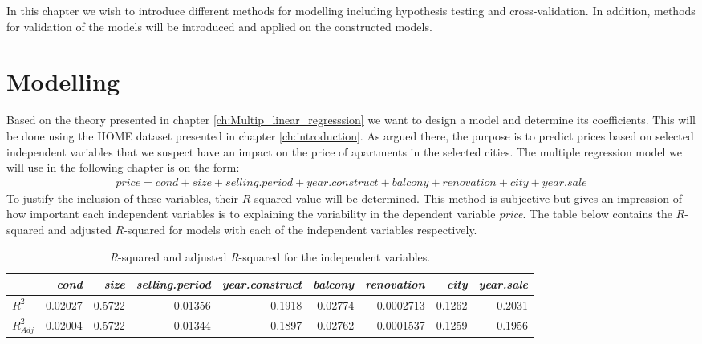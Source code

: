 In this chapter we wish to introduce different methods for modelling including hypothesis testing and cross-validation. In addition, methods for validation of the models will be introduced and applied on the constructed models.

\section{Modelling} \label{sec:modelling}
Based on the theory presented in chapter \ref{ch:Multip_linear_regresssion} we want to design a model and determine its coefficients. 
This will be done using the HOME dataset presented in chapter \ref{ch:introduction}. 
As argued there, the purpose is to predict prices based on selected independent variables that we suspect have an impact on the price of apartments in the selected cities.
The multiple regression model we will use in the following chapter is on the form:
\begin{align*}
    \textit{price} = \textit{cond} + \textit{size} + \textit{selling.period} + \textit{year.construct} + \textit{balcony} + \textit{renovation} + \textit{city} + year.sale
\end{align*}
To justify the inclusion of these variables, their $R$-squared value will be determined. 
This method is subjective but gives an impression of how important each independent variables is to explaining the variability in the dependent variable \textit{price}. 
The table below contains the $R$-squared and adjusted $R$-squared for models with each of the independent variables respectively.
\begin{table}[H]
\centering
\footnotesize
\begin{tabular}{lrrrrrrrr}
\toprule
\textbf{}          & \textit{cond} & \textit{size} & \textit{selling.period} & \textit{year.construct} & \textit{balcony} & \textit{renovation} & \textit{city} & \textit{year.sale} \\
\midrule
$R^2$ & 0.02027                & 0.5722              & 0.01356           & 0.1918                  & 0.02774        & 0.0002713              & 0.1262   & 0.2031     \\
$R^2_{Adj}$ & 0.02004                & 0.5722              & 0.01344           & 0.1897                  & 0.02762        & 0.0001537              & 0.1259  & 0.1956 \\
\bottomrule
\end{tabular}
\caption{\textit{R}-squared and adjusted \textit{R}-squared for the independent variables.}
\label{tab:r-squared}
\end{table}


